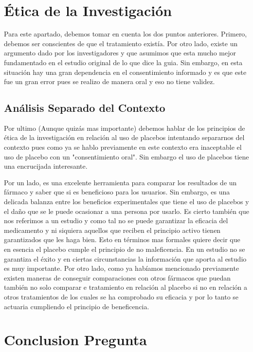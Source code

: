 \documentclass{report}
\begin{document}
\section*{Ética de la Investigación}

Para este apartado, debemos tomar en cuenta los dos puntos anteriores. Primero, debemos ser conscientes de que el tratamiento existía. Por otro lado, existe un argumento dado por los investigadores y que asumimos que esta mucho mejor fundamentado en el estudio original de lo que dice la guia. Sin embargo, en esta situación hay una gran dependencia en el consentimiento informado y es que este fue un gran error pues se realizo de manera oral y eso no tiene validez.

\subsection*{Análisis Separado del Contexto}

Por ultimo (Aunque quizás mas importante) debemos hablar de los principios de ética de la investigación en relación al uso de placebos intentando separarnos del contexto pues como ya se hablo previamente en este contexto era inaceptable el uso de placebo con un "consentimiento oral". Sin embargo el uso de placebos tiene una encrucijada interesante.

Por un lado, es una excelente herramienta para comparar los resultados de un fármaco y saber que si es beneficioso para los usuarios. Sin embargo, es una delicada balanza entre los beneficios experimentales que tiene el uso de placebos y el daño que se le puede ocasionar a una persona por usarlo. Es cierto también que nos referimos a un estudio y como tal no se puede garantizar la eficacia del medicamento y ni siquiera aquellos que reciben el principio activo tienen garantizados que les haga bien. Esto en términos mas formales quiere decir que en esencia el placebo cumple el principio de no maleficencia. En un estudio no se garantiza el éxito y en ciertas circunstancias la información que aporta al estudio es muy importante. Por otro lado, como ya habíamos mencionado previamente existen maneras de conseguir comparaciones con otros fármacos que puedan también no solo comparar e tratamiento en relación al placebo si no en relación a otros tratamientos de los cuales se ha comprobado su eficacia y por lo tanto se actuaria cumpliendo el principio de beneficencia.

\section*{Conclusion Pregunta}
\end{document}
